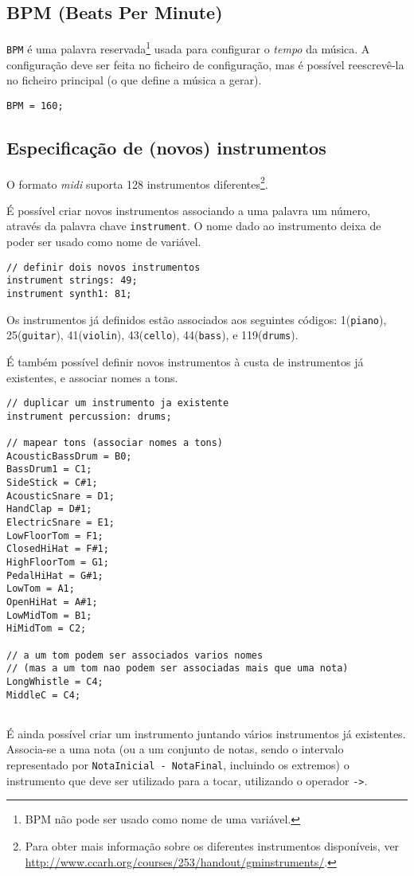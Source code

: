 \documentclass{article}
\begin{document}
\subsection{BPM (Beats Per Minute)}
\texttt{BPM} é uma palavra reservada\footnote{BPM não pode ser usado como nome de uma variável.} usada para configurar o \textit{tempo} da música. A configuração deve ser feita no ficheiro de configuração, mas é possível reescrevê-la no ficheiro principal (o que define a música a gerar).
\begin{lstlisting} 
BPM = 160;
\end{lstlisting}

\subsection{Especificação de (novos) instrumentos}
O formato \textit{midi} suporta 128 instrumentos diferentes\footnote{Para obter mais informação sobre os diferentes instrumentos disponíveis, ver \url{http://www.ccarh.org/courses/253/handout/gminstruments/}.}.

É possível criar novos instrumentos associando a uma palavra um número, através da palavra chave \texttt{instrument}. O nome dado ao instrumento deixa de poder ser usado como nome de variável.

\begin{lstlisting} 
// definir dois novos instrumentos
instrument strings: 49;
instrument synth1: 81;
\end{lstlisting}

Os instrumentos já definidos estão associados aos seguintes códigos: 1(\texttt{piano}), 25(\texttt{guitar}), 41(\texttt{violin}), 43(\texttt{cello}), 44(\texttt{bass}), e 119(\texttt{drums}). 

É também possível definir novos instrumentos à custa de instrumentos já existentes, e associar nomes a tons.

\begin{lstlisting} 
// duplicar um instrumento ja existente
instrument percussion: drums;

// mapear tons (associar nomes a tons)
AcousticBassDrum = B0;
BassDrum1 = C1;
SideStick = C#1;
AcousticSnare = D1;
HandClap = D#1;
ElectricSnare = E1;
LowFloorTom = F1;
ClosedHiHat = F#1;
HighFloorTom = G1;
PedalHiHat = G#1;
LowTom = A1;
OpenHiHat = A#1;
LowMidTom = B1;
HiMidTom = C2;

// a um tom podem ser associados varios nomes
// (mas a um tom nao podem ser associadas mais que uma nota)
LongWhistle = C4;
MiddleC = C4;
                     	 
\end{lstlisting}	 
É ainda possível criar um instrumento juntando vários instrumentos já existentes. Associa-se a uma nota (ou a um conjunto de notas, sendo o intervalo representado por \texttt{NotaInicial - NotaFinal}, incluindo os extremos) o instrumento que deve ser utilizado para a tocar, utilizando o operador \texttt{->}.
\end{document}
